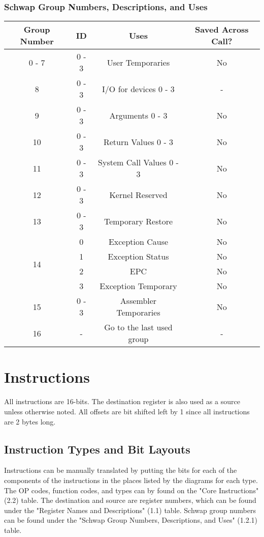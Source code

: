 \documentclass{article}
\begin{document}
		\subsubsection{Schwap Group Numbers, Descriptions, and Uses}
			\begin{center}
				\begin{tabular}{| c | c | c | c |}
					\hline
				    	Group Number   & ID    & Uses                     & Saved Across Call? \\ \hline
					    0 - 7          & 0 - 3 & User Temporaries         & No \\ \hline
					    8              & 0 - 3 & I/O for devices 0 - 3    & -  \\ \hline
					    9              & 0 - 3 & Arguments 0 - 3          & No \\ \hline
					    10             & 0 - 3 & Return Values 0 - 3      & No \\ \hline
					    11             & 0 - 3 & System Call Values 0 - 3 & No \\ \hline
				    	12             & 0 - 3 & Kernel Reserved          & No \\ \hline
					    13             & 0 - 3 & Temporary Restore        & No \\ \hline
					    \multirow{4}{*}{14} & 0 & Exception Cause         & No \\
					    			   & 1     & Exception Status         & No \\
								       & 2     & EPC                      & No \\
								       & 3     & Exception Temporary      & No \\ \hline
					    15             & 0 - 3 & Assembler Temporaries    & No \\ \hline
					    16             & -     & Go to the last used group & - \\
					\hline
				\end{tabular}
			\end{center}
\newpage
\section{Instructions}
	All instructions are 16-bits.  The destination register is also used as a source unless otherwise noted.  All offsets are bit shifted left by 1 since all instructions are 2 bytes long.
	\subsection{Instruction Types and Bit Layouts}
		Instructions can be manually translated by putting the bits for each of the components of the instructions in the places listed by the diagrams for each type.  The OP codes, function codes, and types can by found on the "Core Instructions" (2.2) table.  The destination and source are register numbers, which can be found under the "Register Names and Descriptions" (1.1) table.  Schwap group numbers can be found under the "Schwap Group Numbers, Descriptions, and Uses" (1.2.1) table.
\end{document}
